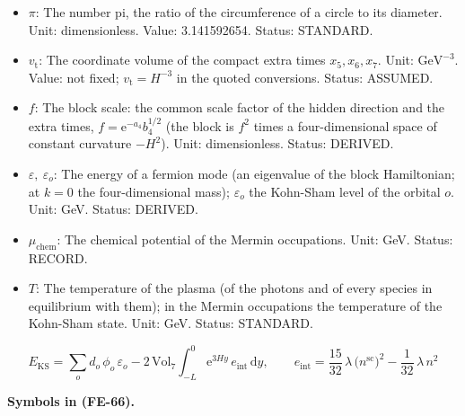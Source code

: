 \documentclass[
  10pt,
]{article}
\begin{document}
\begin{itemize}
  Kohn-Sham cell. Unit: GeV. Value: \(0.25\,H\). Status: RECORD.
\item
  \(\pi\): The number pi, the ratio of the circumference of a circle to
  its diameter. Unit: dimensionless. Value: 3.141592654. Status:
  STANDARD.
\item
  \(v_{\mathrm{t}}\): The coordinate volume of the compact extra times
  \(x_5, x_6, x_7\). Unit: \(\mathrm{GeV}^{-3}\). Value: not fixed;
  \(v_{\mathrm{t}} = H^{-3}\) in the quoted conversions. Status:
  ASSUMED.
\item
  \(f\): The block scale: the common scale factor of the hidden
  direction and the extra times, \(f = \mathrm{e}^{-a_4}b_4^{1/2}\) (the
  block is \(f^2\) times a four-dimensional space of constant curvature
  \(-H^2\)). Unit: dimensionless. Status: DERIVED.
\item
  \(\varepsilon,\ \varepsilon_o\): The energy of a fermion mode (an
  eigenvalue of the block Hamiltonian; at \(k = 0\) the four-dimensional
  mass); \(\varepsilon_o\) the Kohn-Sham level of the orbital \(o\).
  Unit: GeV. Status: DERIVED.
\item
  \(\mu_{\mathrm{chem}}\): The chemical potential of the Mermin
  occupations. Unit: GeV. Status: RECORD.
\item
  \(T\): The temperature of the plasma (of the photons and of every
  species in equilibrium with them); in the Mermin occupations the
  temperature of the Kohn-Sham state. Unit: GeV. Status: STANDARD.
\end{itemize}

\[
E_{\mathrm{KS}} = \sum_o d_o\,\phi_o\,\varepsilon_o -
 2\,\mathrm{Vol}_7\int_{-L}^{0}\mathrm{e}^{3Hy}\,e_{\mathrm{int}}\,\mathrm{d}y,
\qquad e_{\mathrm{int}} = \frac{15}{32}\,\lambda\,\big(n^{\mathrm{sc}}\big)^2 -
 \frac{1}{32}\,\lambda\,n^2 \tag{FE-66}
\]

\textbf{Symbols in (FE-66).}
\end{document}
